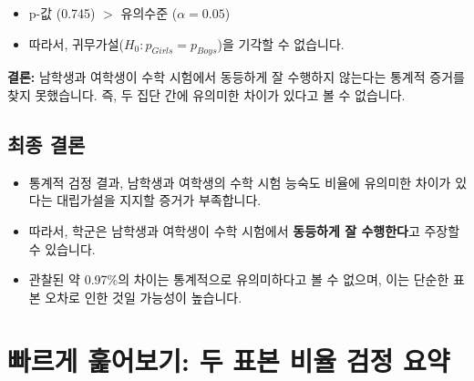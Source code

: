 \documentclass[11pt,a4paper]{article}
\theoremstyle{definition}
\begin{document}
\begin{summarybox}[title=p-값 해석:]
\begin{itemize}
    \item p-값 (0.745) $>$ 유의수준 ($\alpha=0.05$)
    \item 따라서, 귀무가설($H_0: p_{Girls} = p_{Boys}$)을 기각할 수 없습니다.
\end{itemize}
\textbf{결론:} 남학생과 여학생이 수학 시험에서 동등하게 잘 수행하지 않는다는 통계적 증거를 찾지 못했습니다. 즉, 두 집단 간에 유의미한 차이가 있다고 볼 수 없습니다.
\end{summarybox}

\subsection{최종 결론}

\begin{summarybox}[title=종합 결론:]
\begin{itemize}
    \item 통계적 검정 결과, 남학생과 여학생의 수학 시험 능숙도 비율에 유의미한 차이가 있다는 대립가설을 지지할 증거가 부족합니다.
    \item 따라서, 학군은 남학생과 여학생이 수학 시험에서 \textbf{동등하게 잘 수행한다}고 주장할 수 있습니다.
    \item 관찰된 약 0.97\%의 차이는 통계적으로 유의미하다고 볼 수 없으며, 이는 단순한 표본 오차로 인한 것일 가능성이 높습니다.
\end{itemize}
\end{summarybox}

\newpage
\section{빠르게 훑어보기: 두 표본 비율 검정 요약}
\end{document}
